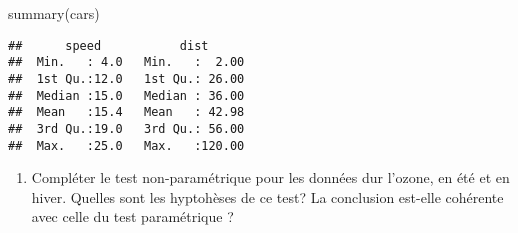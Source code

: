 \documentclass[
]{article}
\newenvironment{Shaded}{\begin{snugshade}}{\end{snugshade}}
\newcommand{\FunctionTok}[1]{\textcolor[rgb]{0.00,0.00,0.00}{#1}}
\newcommand{\NormalTok}[1]{#1}
\providecommand{\tightlist}{%
  \setlength{\itemsep}{0pt}\setlength{\parskip}{0pt}}
\begin{document}
\begin{Shaded}
\begin{Highlighting}[]
\FunctionTok{summary}\NormalTok{(cars)}
\end{Highlighting}
\end{Shaded}

\begin{verbatim}
##      speed           dist       
##  Min.   : 4.0   Min.   :  2.00  
##  1st Qu.:12.0   1st Qu.: 26.00  
##  Median :15.0   Median : 36.00  
##  Mean   :15.4   Mean   : 42.98  
##  3rd Qu.:19.0   3rd Qu.: 56.00  
##  Max.   :25.0   Max.   :120.00
\end{verbatim}

\begin{enumerate}
\def\labelenumi{\arabic{enumi}.}
\setcounter{enumi}{6}
\tightlist
\item
  Compléter le test non-paramétrique pour les données dur l'ozone, en
  été et en hiver. Quelles sont les hyptohèses de ce test? La conclusion
  est-elle cohérente avec celle du test paramétrique ?
\end{enumerate}
\end{document}
